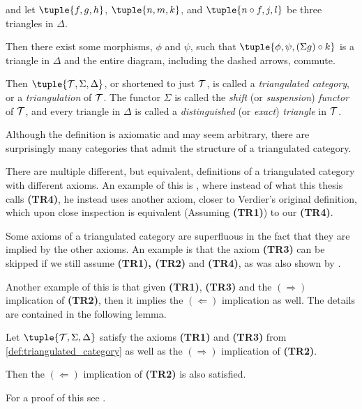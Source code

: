 \begin{definition}
\begin{enumerate}[label={(\bfseries TR\arabic*)}]
{\begin{center}
            \end{center}
            and let \( \tuple{f, g, h} \), \( \tuple{n, m, k} \), and \( \tuple{n \circ f, j, l} \) be three triangles in \( \Delta \).

            Then there exist some morphisms, \( \phi \) and \( \psi \), such that \( \tuple{\phi, \psi, (\Sigma g) \circ k} \) is a triangle in \( \Delta \) and the entire diagram, including the dashed arrows, commute.
        }
    \end{enumerate}

    Then \( \tuple{ \Tc, \Sigma, \Delta } \), or shortened to just \( {\mathcal{T}} \), is called a \emph{triangulated category}, or a \emph{triangulation} of \( {\mathcal{T}} \). The functor \( \Sigma \) is called the \emph{shift} (or \emph{suspension}) \emph{functor} of \( {\mathcal{T}} \), and every triangle in \( \Delta \) is called a \emph{distinguished} (or \emph{exact}) \emph{triangle} in \( {\mathcal{T}} \). 
\end{definition}

Although the definition is axiomatic and may seem arbitrary, there are surprisingly many categories that admit the structure of a triangulated category.

There are multiple different, but equivalent, definitions of a triangulated category with different axioms. An example of this is \cite[Definition 2.1]{May_2001}, where instead of what this thesis calls {\bf (TR4)}, he instead uses another axiom, closer to Verdier's original definition, which upon close inspection is equivalent (Assuming {\bf (TR1)}) to our {\bf (TR4)}.

Some axioms of a triangulated category are superfluous in the fact that they are implied by the other axioms. An example is that the axiom {\bf (TR3)} can be skipped if we still assume {\bf (TR1), (TR2)} and {\bf (TR4)}, as was also shown by \cite[Lemma 2.2]{May_2001}.

Another example of this is that given {\bf (TR1)}, {\bf (TR3)} and the \( (\Rightarrow) \) implication of {\bf (TR2)}, then it implies the \( (\Leftarrow) \) implication as well. The details are contained in the following lemma.

\begin{lemma}
    \label{lem:triangulated_category-TR2-only_one_rotation}
    Let \( \tuple{ \Tc, \Sigma, \Delta } \) satisfy the axioms {\bf (TR1)} and {\bf (TR3)} from \autoref{def:triangulated_category} as well as the \( (\Rightarrow) \) implication of {\bf (TR2)}.

    Then the \( (\Leftarrow) \) implication of {\bf (TR2)} is also satisfied.
\end{lemma}
For a proof of this see \cite[Lemma 2.4]{May_2001}.

